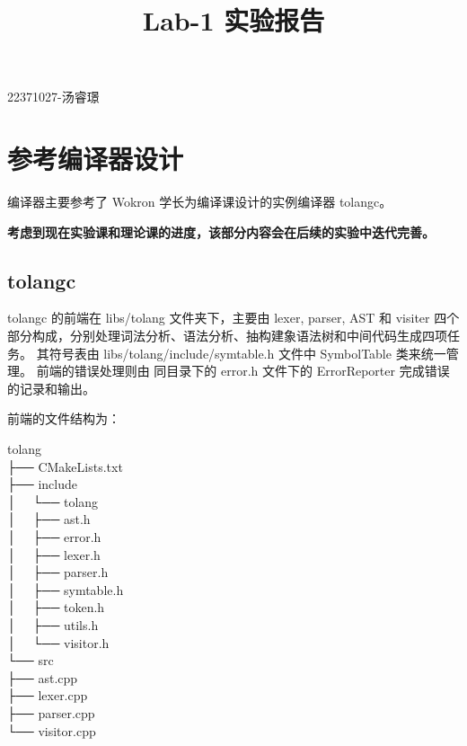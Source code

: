 \documentclass[a4paper]{article}
\title{Lab-1 实验报告}
\date{}
\begin{document}
	\maketitle
	\vspace{-6em} %
	
	\begin{center}22371027-汤睿璟\end{center}
	
	\section{参考编译器设计}
	
	编译器主要参考了 Wokron 学长为编译课设计的实例编译器 tolangc。
	
	\textbf{考虑到现在实验课和理论课的进度，该部分内容会在后续的实验中迭代完善。}
	
	\subsection{tolangc}
	
	tolangc 的前端在 libs/tolang 文件夹下，主要由 lexer, parser, AST 和 visiter 四个部分构成，分别处理词法分析、语法分析、抽构建象语法树和中间代码生成四项任务。
	其符号表由 libs/tolang/include/symtable.h 文件中 SymbolTable 类来统一管理。
	前端的错误处理则由 同目录下的 error.h 文件下的 ErrorReporter 完成错误的记录和输出。
	
	前端的文件结构为：
	
	\begin{algorithm}
		tolang \\
		├── CMakeLists.txt\\
		├── include \\
		│   └── tolang \\
		│       ├── ast.h \\
		│       ├── error.h \\
		│       ├── lexer.h \\
		│       ├── parser.h \\ 
		│       ├── symtable.h \\
		│       ├── token.h \\
		│       ├── utils.h \\
		│       └── visitor.h \\
		└── src \\
		├── ast.cpp \\
		├── lexer.cpp \\
		├── parser.cpp \\
		└── visitor.cpp 
	\end{algorithm}
	
\end{document}
